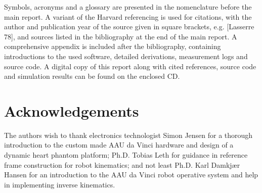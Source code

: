 Symbols, acronyms and a glossary are presented in the nomenclature before the main report.
A variant of the Harvard referencing is used for citations, with the author and publication year of the source given in square brackets, e.g. [Lasserre 78], and sources listed in the bibliography at the end of the main report. %
A comprehensive appendix is included after the bibliography, containing introductions to the used software, detailed derivations, measurement logs and source code.
A digital copy of this report along with cited references, source code and simulation results can be found on the enclosed CD.

\section*{Acknowledgements}
\vspace*{-2mm}
The authors wish to thank electronics technologist Simon Jensen for a thorough introduction to the custom made AAU da Vinci hardware and design of a dynamic heart phantom platform; Ph.D. Tobias Leth for guidance in reference frame construction for robot kinematics; and not least Ph.D. Karl Damkj\ae r Hansen for an introduction to the AAU da Vinci robot operative system and help in implementing inverse kinematics.


